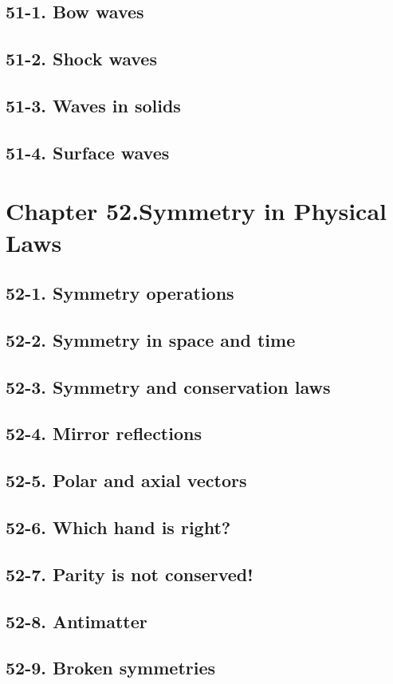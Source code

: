 \documentclass{article}
\begin{document}
\subsection{51-1. Bow waves}
\subsection{51-2. Shock waves}
\subsection{51-3. Waves in solids}
\subsection{51-4. Surface waves}
\section{Chapter 52.Symmetry in Physical Laws}
\subsection{52-1. Symmetry operations}
\subsection{52-2. Symmetry in space and time}
\subsection{52-3. Symmetry and conservation laws}
\subsection{52-4. Mirror reflections}
\subsection{52-5. Polar and axial vectors}
\subsection{52-6. Which hand is right?}
\subsection{52-7. Parity is not conserved!}
\subsection{52-8. Antimatter}
\subsection{52-9. Broken symmetries}
\end{document}
